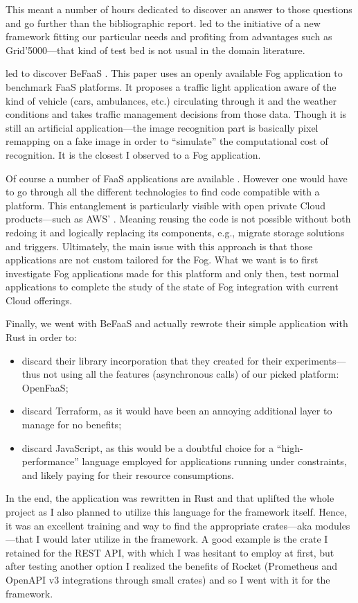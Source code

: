 This meant a number of hours dedicated to discover an answer to those questions and go further than the bibliographic report.  led to the initiative of a new framework fitting our particular needs and profiting from advantages such as Grid'5000—that kind of test bed is not usual in the domain literature.

 led to discover BeFaaS \cite{grambow_befaas_2021}. This paper uses an openly available Fog application to benchmark \gls{FaaS} platforms. It proposes a traffic light application aware of the kind of vehicle (cars, ambulances, etc.) circulating through it and the weather conditions and takes traffic management decisions from those data. Though it is still an artificial application—the image recognition part is basically pixel remapping on a fake image in order to “simulate” the computational cost of recognition. It is the closest I observed to a Fog application.

Of course a number of \gls{FaaS} applications are available \cite{eskandani_wonderless_2021}. However one would have to go through all the different technologies to find code compatible with a platform. This entanglement is particularly visible with open private Cloud products—such as AWS' \cite{tarneberg_experiences_2016,eismann_state_2021}. Meaning reusing the code is not possible without both redoing it and logically replacing its components, e.g., migrate storage solutions and triggers. Ultimately, the main issue with this approach is that those applications are not custom tailored for the Fog. What we want is to first investigate Fog applications made for this platform and only then, test normal applications to complete the study of the state of Fog integration with current Cloud offerings.

Finally, we went with BeFaaS \cite{grambow_befaas_2021} and actually rewrote their simple application with Rust in order to:
\begin{itemize}
	\item discard their library incorporation that they created for their experiments—thus not using all the features (asynchronous calls) of our picked platform: OpenFaaS;
	\item discard Terraform, as it would have been an annoying additional layer to manage for no benefits;
	\item discard JavaScript, as this would be a doubtful choice for a “high-performance” language employed for applications running under constraints, and likely paying for their resource consumptions.
\end{itemize}
In the end, the application was rewritten in Rust and that uplifted the whole project as I also planned to utilize this language for the framework itself. Hence, it was an excellent training and way to find the appropriate crates—aka modules—that I would later utilize in the framework. A good example is the crate I retained for the \gls{REST} \gls{API}, with which I was hesitant to employ at first, but after testing another option I realized the benefits of Rocket \cite{benitez_rocket_2022} (Prometheus and OpenAPI v3 integrations through small crates) and so I went with it for the framework.

